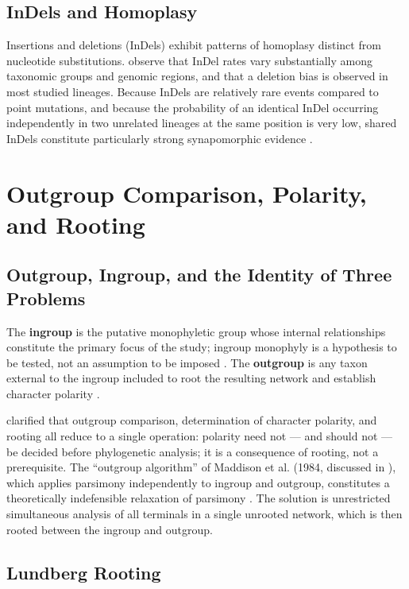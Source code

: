 \subsection{InDels and Homoplasy}

Insertions and deletions (InDels) exhibit patterns of homoplasy distinct from nucleotide substitutions. \textcite{redelings2024} observe that InDel rates vary substantially among taxonomic groups and genomic regions, and that a deletion bias is observed in most studied lineages. Because InDels are relatively rare events compared to point mutations, and because the probability of an identical InDel occurring independently in two unrelated lineages at the same position is very low, shared InDels constitute particularly strong synapomorphic evidence \parencite{redelings2024}.

\section{Outgroup Comparison, Polarity, and Rooting}
\label{sec:outgroup}

\subsection{Outgroup, Ingroup, and the Identity of Three Problems}

The \textbf{ingroup} is the putative monophyletic group whose internal relationships constitute the primary focus of the study; ingroup monophyly is a hypothesis to be tested, not an assumption to be imposed \parencite{nixon1993}. The \textbf{outgroup} is any taxon external to the ingroup included to root the resulting network and establish character polarity \parencite{nixon1993,grant2019}.

\textcite{nixon1993} clarified that outgroup comparison, determination of character polarity, and rooting all reduce to a single operation: polarity need not --- and should not --- be decided before phylogenetic analysis; it is a consequence of rooting, not a prerequisite. The ``outgroup algorithm'' of Maddison et al. (1984, discussed in \cite{nixon1993}), which applies parsimony independently to ingroup and outgroup, constitutes a theoretically indefensible relaxation of parsimony \parencite{nixon1993}. The solution is unrestricted simultaneous analysis of all terminals in a single unrooted network, which is then rooted between the ingroup and outgroup.

\subsection{Lundberg Rooting}

